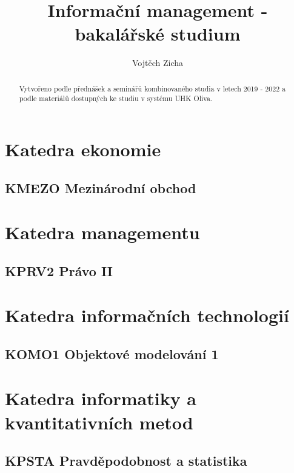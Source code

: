 \documentclass[twoside,12pt]{report}
\title{Informační management - bakalářské studium}
\author{Vojtěch Zicha}
\begin{document}
\maketitle%

\begin{abstract}
Vytvořeno podle přednášek a seminářů kombinovaného studia v letech 2019 - 2022 a podle materiálů dostupných ke studiu v systému UHK Oliva.
\end{abstract}

\tableofcontents
\clearpage

\part{Katedra ekonomie}
\chapter{KMEZO Mezinárodní obchod}


\part{Katedra managementu}
\chapter{KPRV2 Právo II}


\part{Katedra informačních technologií}
\chapter{KOMO1 Objektové modelování 1}


\part{Katedra informatiky a kvantitativních metod}
\chapter{KPSTA Pravděpodobnost a statistika}

\end{document}
